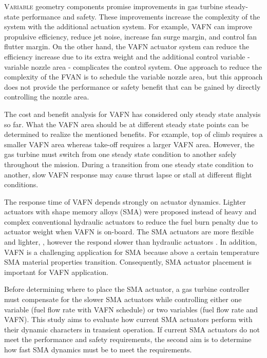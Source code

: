 
\lettrine[nindent=0pt]{V}{ariable} geometry components promise improvements
in gas turbine steady-state performance and safety. These improvements 
increase the complexity of the system with the additional actuation system. For
example, VAFN can improve propulsive efficiency, reduce jet noise, increase fan 
surge margin, and control fan flutter margin. On the other hand, the VAFN 
actuator system can reduce the efficiency increase due to its extra weight and 
the additional control variable - variable nozzle area - complicates the control 
system. One approach to reduce the complexity of the FVAN is to schedule the 
variable nozzle area, but this approach does not provide the performance or 
safety benefit that can be gained by directly controlling the nozzle area.

The cost and benefit analysis for VAFN has considered only steady state analysis
so far. What the VAFN area should be at different steady state points can be 
determined to realize the mentioned benefits. For example, top of climb requires 
a smaller VAFN area whereas take-off requires a larger VAFN area. However, the
gas turbine must switch from one steady state condition to another safely 
throughout the mission. During a transition from one steady state condition to 
another, slow VAFN response may cause thrust lapse or stall at different flight 
conditions.

The response time of VAFN depends strongly on actuator dynamics. Lighter 
actuators with shape memory alloys (SMA) \cite{Mabe:2008,Mabe:2008:Paris} 
were proposed instead of heavy and complex conventional hydraulic actuators to
reduce the fuel burn penalty due to actuator weight when VAFN is on-board. 
The SMA actuators are more flexible and lighter, , however the respond slower 
than hydraulic actuators \cite{Rey:2001,Barooah:2002,Song:2007}. In addition, 
VAFN is a challenging application for SMA because above a certain temperature 
SMA material properties transition. Consequently, SMA actuator placement is 
important for VAFN application.

Before determining where to place the SMA actuator, a gas turbine controller 
must compensate for the slower SMA actuators while controlling either one 
variable (fuel flow rate with VAFN schedule) or two variables (fuel flow rate and 
VAFN). This study aims to evaluate how current SMA actuators perform with 
their dynamic characters in transient operation. If current SMA actuators do not 
meet the performance and safety requirements, the second aim is to determine 
how fast SMA dynamics must be to meet the requirements.

